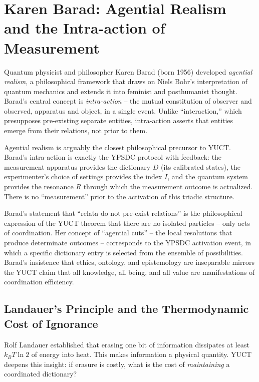 \documentclass[12pt,a4paper]{article}
\begin{document}
	\section{Karen Barad: Agential Realism and the Intra-action of Measurement}
	
	Quantum physicist and philosopher Karen Barad (born 1956) developed \emph{agential realism}, a philosophical framework that draws on Niels Bohr's interpretation of quantum mechanics and extends it into feminist and posthumanist thought. Barad's central concept is \emph{intra-action} -- the mutual constitution of observer and observed, apparatus and object, in a single event. Unlike ``interaction,'' which presupposes pre-existing separate entities, intra-action asserts that entities emerge from their relations, not prior to them.
	
	Agential realism is arguably the closest philosophical precursor to YUCT. Barad's intra-action is exactly the YPSDC protocol with feedback: the measurement apparatus provides the dictionary \(D\) (its calibrated states), the experimenter's choice of settings provides the index \(I\), and the quantum system provides the resonance \(R\) through which the measurement outcome is actualized. There is no ``measurement'' prior to the activation of this triadic structure.
	
	Barad's statement that ``relata do not pre-exist relations'' is the philosophical expression of the YUCT theorem that there are no isolated particles -- only acts of coordination. Her concept of ``agential cuts'' -- the local resolutions that produce determinate outcomes -- corresponds to the YPSDC activation event, in which a specific dictionary entry is selected from the ensemble of possibilities. Barad's insistence that ethics, ontology, and epistemology are inseparable mirrors the YUCT claim that all knowledge, all being, and all value are manifestations of coordination efficiency.
	
	\subsection{Landauer’s Principle and the Thermodynamic Cost of Ignorance}
	
	Rolf Landauer established that erasing one bit of information dissipates at least \(k_B T \ln 2\) of energy into heat. This makes information a physical quantity. YUCT deepens this insight: if erasure is costly, what is the cost of \emph{maintaining} a coordinated dictionary?
	
\end{document}
